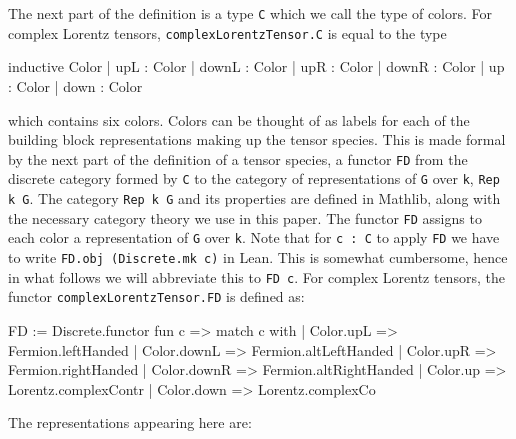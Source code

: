 \documentclass[a4paper, 11pt]{article}
\DeclareRobustCommand{\myinline}{\lstinline}
\begin{document}
The next part of the definition is a type \myinline|C| which we call the type of colors.
For complex Lorentz tensors, \myinline|complexLorentzTensor.C| is equal to the type
\begin{code}
inductive Color
  | upL : Color
  | downL : Color
  | upR : Color
  | downR : Color
  | up : Color
  | down : Color
\end{code}
which contains six colors.
Colors can be thought of as labels for each of the building 
block representations making up the tensor species.  This is made formal by the
next part of the definition of a tensor species, a functor 
\myinline|FD| from the discrete category formed by \myinline|C| to 
the category of representations of \myinline|G| over \myinline|k|, \lstinline|Rep k G|.
The category  \lstinline|Rep k G| and its properties are defined in Mathlib, along 
with the necessary category theory we use in this paper.
The functor \myinline|FD| assigns to each color a representation of \myinline|G| over \myinline|k|.
Note that for \myinline|c : C| to apply \myinline|FD| we have to write 
\myinline|FD.obj (Discrete.mk c)| in Lean. This is somewhat cumbersome, hence in what 
follows we will abbreviate this to \myinline|FD c|.
For complex Lorentz tensors, the functor \myinline|complexLorentzTensor.FD| is defined as:
\begin{code}
FD := Discrete.functor fun c =>
  match c with
  | Color.upL => Fermion.leftHanded
  | Color.downL => Fermion.altLeftHanded
  | Color.upR => Fermion.rightHanded
  | Color.downR => Fermion.altRightHanded
  | Color.up => Lorentz.complexContr
  | Color.down => Lorentz.complexCo
\end{code}
The representations appearing here are: 
\end{document}
